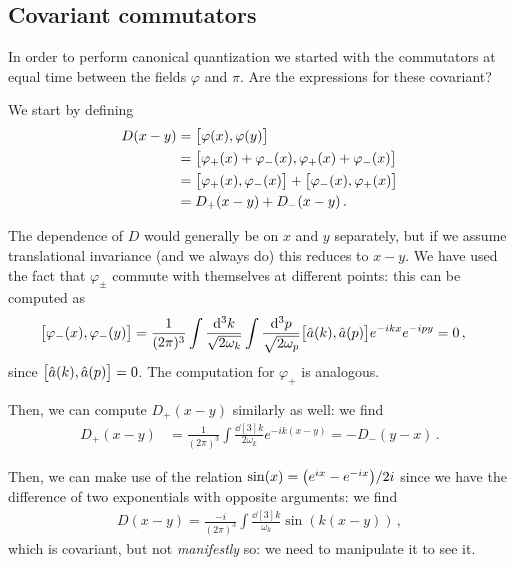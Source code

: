 \documentclass[main.tex]{subfiles}
\begin{document}
\subsection{Covariant commutators} \label{sec:covariant-commutators}

In order to perform canonical quantization we started with the commutators at equal time between the fields \(\varphi \) and \(\pi \). 
Are the expressions for these covariant? 

We start by defining 
%
\begin{align}
D(x - y) &= \qty[\varphi (x), \varphi (y)]  \\
&= \qty[\varphi_{+} (x) + \varphi_{-} (x), \varphi_{+} (x) + \varphi_{-} (x)]  \\
&= \qty[\varphi_{+} (x), \varphi_{-} (x)] + \qty[\varphi_{-} (x), \varphi_{+} (x)]  \\
&= D_+ (x-y) + D_- (x-y)
\,.
\end{align}


The dependence of \(D\) would generally be on \(x\) and \(y\) separately, but if we assume translational invariance (and we always do) this reduces to \(x-y\).
We have used the fact that \(\varphi_{\pm}\) commute with themselves at different points: this can be computed as 
%
\begin{align}
\qty[\varphi_{-}(x) , \varphi_{-}(y)] &=
\frac{1}{(2\pi )^{3}} \int \frac{ \dd[3]{k}}{\sqrt{2 \omega_{k}}}
\int \frac{\dd[3]{p}}{\sqrt{2 \omega_{p}}} 
\qty[\hat{a}(k), \hat{a}(p)] e^{-ikx} e^{-ipy} = 0
\,,
\end{align}
%
since \(\qty[\hat{a}(k), \hat{a}(p)] = 0\). The computation for \(\varphi_{+}\) is analogous. 

Then, we can compute \(D_{+} (x-y)\) similarly as well: we find 
%
\begin{align}
D_{+} (x-y) &= \frac{1}{(2\pi )^3} \int \frac{ \dd[3]{k} }{2 \omega_{k}}
e^{-ik(x-y)} = - D_{-} (y-x)  
\,.
\end{align}

Then, we can make use of the relation \(\sin(x) = \qty(e^{ix} - e^{-ix}) / 2i\) since we have the difference of two exponentials with opposite arguments: we find 
%
\begin{align}
D(x-y) = \frac{-i}{(2 \pi )^3}
\int \frac{ \dd[3]{k}}{\omega_{k}} \sin(k (x-y))
\,,
\end{align}
%
which is covariant, but not \emph{manifestly} so: we need to manipulate it to see it.
\end{document}
